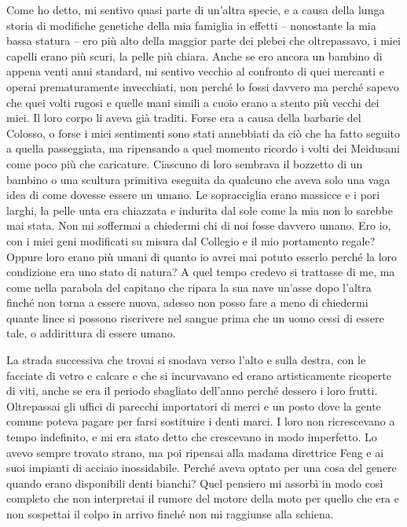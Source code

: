 Come ho detto, mi sentivo quasi parte di un'altra specie, e a causa
della lunga storia di modifiche genetiche della mia famiglia in effetti
-- nonostante la mia bassa statura -- ero più alto della maggior parte
dei plebei che oltrepassavo, i miei capelli erano più scuri, la pelle
più chiara. Anche se ero ancora un bambino di appena venti anni
standard, mi sentivo vecchio al confronto di quei mercanti e operai
prematuramente invecchiati, non perché lo fossi davvero ma perché sapevo
che quei volti rugosi e quelle mani simili a cuoio erano a stento più
vecchi dei miei. Il loro corpo li aveva già traditi. Forse era a causa
della barbarie del Colosso, o forse i miei sentimenti sono stati
annebbiati da ciò che ha fatto seguito a quella passeggiata, ma
ripensando a quel momento ricordo i volti dei Meidusani come poco più
che caricature. Ciascuno di loro sembrava il bozzetto di un bambino o
una scultura primitiva eseguita da qualcuno che aveva solo una vaga idea
di come dovesse essere un umano. Le sopracciglia erano massicce e i pori
larghi, la pelle unta era chiazzata e indurita dal sole come la mia non
lo sarebbe mai stata. Non mi soffermai a chiedermi chi di noi fosse
davvero umano. Ero io, con i miei geni modificati su misura dal Collegio
e il mio portamento regale? Oppure loro erano più umani di quanto io
avrei mai potuto esserlo perché la loro condizione era uno stato di
natura? A quel tempo credevo si trattasse di me, ma come nella parabola
del capitano che ripara la sua nave un'asse dopo l'altra finché non
torna a essere nuova, adesso non posso fare a meno di chiedermi quante
linee si possono riscrivere nel sangue prima che un uomo cessi di essere
tale, o addirittura di essere umano.

La strada successiva che trovai si snodava verso l'alto e sulla destra,
con le facciate di vetro e calcare e che si incurvavano ed erano
artisticamente ricoperte di viti, anche se era il periodo sbagliato
dell'anno perché dessero i loro frutti. Oltrepassai gli uffici di
parecchi importatori di merci e un posto dove la gente comune poteva
pagare per farsi sostituire i denti marci. I loro non ricrescevano a
tempo indefinito, e mi era stato detto che crescevano in modo
imperfetto. Lo avevo sempre trovato strano, ma poi ripensai alla madama
direttrice Feng e ai suoi impianti di acciaio inossidabile. Perché aveva
optato per una cosa del genere quando erano disponibili denti bianchi?
Quel pensiero mi assorbì in modo così completo che non interpretai il
rumore del motore della moto per quello che era e non sospettai il colpo
in arrivo finché non mi raggiunse alla schiena.

